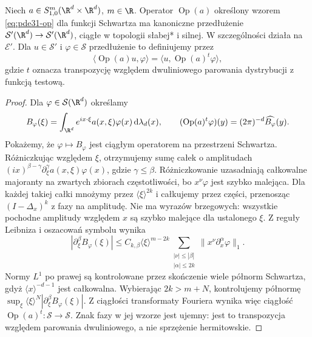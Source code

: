 \begin{lemat}
\label{lem:pde31-distribution-op}
Niech $a\in S^m_{1,0}(\R^d\times\R^d)$, $m\in\R$.
Operator $\operatorname{Op}(a)$ określony wzorem
\eqref{eq:pde31-op} dla funkcji Schwartza ma
kanoniczne przedłużenie
$\mathcal S'(\R^d)\to\mathcal S'(\R^d)$,
ciągłe w topologii słabej* i silnej.
W szczególności działa na $\mathcal E'$.
Dla $u\in\mathcal S'$ i $\varphi\in\mathcal S$
przedłużenie to definiujemy przez
\[
 \langle\operatorname{Op}(a)u,\varphi\rangle
 =\langle u,\operatorname{Op}(a)^t\varphi\rangle,
\]
gdzie $t$ oznacza transpozycję względem dwuliniowego
parowania dystrybucji z funkcją testową.
\end{lemat}
\begin{proof}
Dla $\varphi\in\mathcal S(\R^d)$ określamy
\[
 B_\varphi(\xi)=\int_{\R^d}e^{ix\cdot\xi}a(x,\xi)
 \varphi(x)\,\mathrm d\lambda_d(x),\qquad
 (\operatorname{Op}(a)^t\varphi)(y)
 =(2\pi)^{-d}\widehat{B_\varphi}(y).
\]
Pokażemy, że $\varphi\mapsto B_\varphi$ jest
ciągłym operatorem na przestrzeni Schwartza.
Różniczkując względem $\xi$, otrzymujemy sumę
całek o amplitudach
$(ix)^{\beta-\gamma}\partial_\xi^\gamma a(x,\xi)
\varphi(x)$, gdzie $\gamma\le\beta$.
Różniczkowanie uzasadniają całkowalne majoranty
na zwartych zbiorach częstotliwości,
bo $x^\nu\varphi$ jest szybko malejąca.
Dla każdej takiej całki mnożymy przez
$\langle\xi\rangle^{2k}$ i całkujemy przez części,
przenosząc $(I-\Delta_x)^k$ z fazy na amplitudę.
Nie ma wyrazów brzegowych: wszystkie pochodne
amplitudy względem $x$ są szybko malejące
dla ustalonego $\xi$.
Z reguły Leibniza i oszacowań symbolu wynika
\[
 |\partial_\xi^\beta B_\varphi(\xi)|
 \le C_{k,\beta}\langle\xi\rangle^{m-2k}
 \sum_{\substack{|\nu|\le|\beta|\\|\alpha|\le2k}}
 \|x^\nu\partial_x^\alpha\varphi\|_1 .
\]
Normy $L^1$ po prawej są kontrolowane przez
skończenie wiele półnorm Schwartza, gdyż
$\langle x\rangle^{-d-1}$ jest całkowalna.
Wybierając $2k>m+N$, kontrolujemy półnormę
$\sup_\xi\langle\xi\rangle^N
|\partial_\xi^\beta B_\varphi(\xi)|$.
Z ciągłości transformaty Fouriera wynika więc
ciągłość $\operatorname{Op}(a)^t:\mathcal S\to\mathcal S$.
Znak fazy w jej wzorze jest ujemny:
jest to transpozycja względem parowania
dwuliniowego, a nie sprzężenie hermitowskie.


\end{proof}
